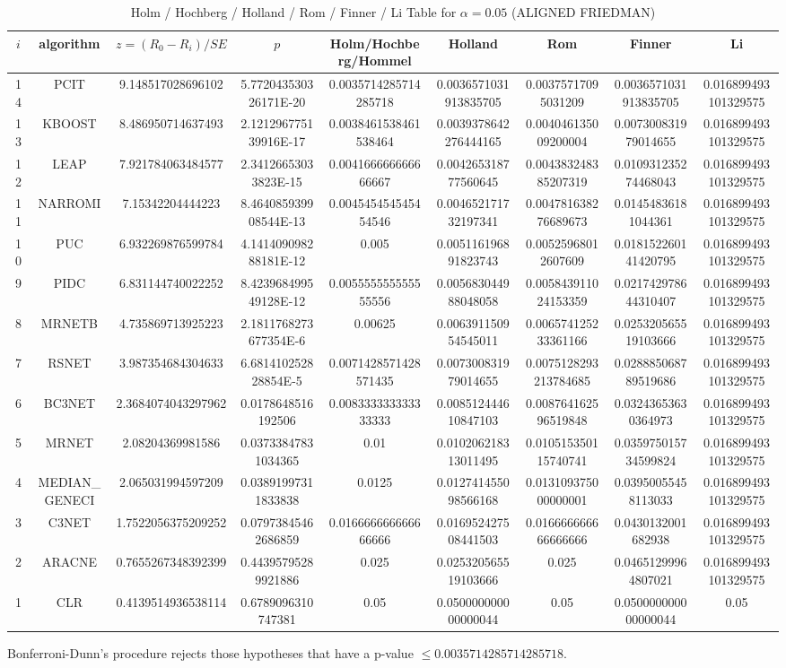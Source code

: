 \documentclass[a4paper,10pt]{article}
\begin{document}
\begin{landscape}
\begin{table}[!htp]
\centering\scriptsize
\caption{Holm / Hochberg / Holland / Rom / Finner / Li Table for $\alpha=0.05$ (ALIGNED FRIEDMAN)}
\begin{tabular}{ccccccccc}
$i$&algorithm&$z=(R_0 - R_i)/SE$&$p$&Holm/Hochberg/Hommel&Holland&Rom&Finner&Li\\
\hline
14&PCIT&9.148517028696102&5.772043530326171E-20&0.0035714285714285718&0.0036571031913835705&0.00375717095031209&0.0036571031913835705&0.016899493101329575\\
13&KBOOST&8.486950714637493&2.121296775139916E-17&0.0038461538461538464&0.0039378642276444165&0.004046135009200004&0.007300831979014655&0.016899493101329575\\
12&LEAP&7.921784063484577&2.34126653033823E-15&0.004166666666666667&0.004265318777560645&0.004383248385207319&0.010931235274468043&0.016899493101329575\\
11&NARROMI&7.15342204444223&8.464085939908544E-13&0.004545454545454546&0.004652171732197341&0.004781638276689673&0.01454836181044361&0.016899493101329575\\
10&PUC&6.932269876599784&4.141409098288181E-12&0.005&0.005116196891823743&0.00525968012607609&0.018152260141420795&0.016899493101329575\\
9&PIDC&6.831144740022252&8.423968499549128E-12&0.005555555555555556&0.005683044988048058&0.005843911024153359&0.021742978644310407&0.016899493101329575\\
8&MRNETB&4.735869713925223&2.1811768273677354E-6&0.00625&0.006391150954545011&0.006574125233361166&0.025320565519103666&0.016899493101329575\\
7&RSNET&3.987354684304633&6.681410252828854E-5&0.0071428571428571435&0.007300831979014655&0.0075128293213784685&0.028885068789519686&0.016899493101329575\\
6&BC3NET&2.3684074043297962&0.0178648516192506&0.008333333333333333&0.008512444610847103&0.008764162596519848&0.03243653630364973&0.016899493101329575\\
5&MRNET&2.08204369981586&0.03733847831034365&0.01&0.010206218313011495&0.010515350115740741&0.035975015734599824&0.016899493101329575\\
4&MEDIAN_GENECI&2.065031994597209&0.03891997311833838&0.0125&0.012741455098566168&0.013109375000000001&0.03950055458113033&0.016899493101329575\\
3&C3NET&1.7522056375209252&0.07973845462686859&0.016666666666666666&0.016952427508441503&0.016666666666666666&0.0430132001682938&0.016899493101329575\\
2&ARACNE&0.7655267348392399&0.44395795289921886&0.025&0.025320565519103666&0.025&0.04651299964807021&0.016899493101329575\\
1&CLR&0.4139514936538114&0.6789096310747381&0.05&0.050000000000000044&0.05&0.050000000000000044&0.05\\
\hline
\end{tabular}
\end{table}
Bonferroni-Dunn's procedure rejects those hypotheses that have a p-value $\le0.0035714285714285718$.



\end{landscape}
\end{document}
